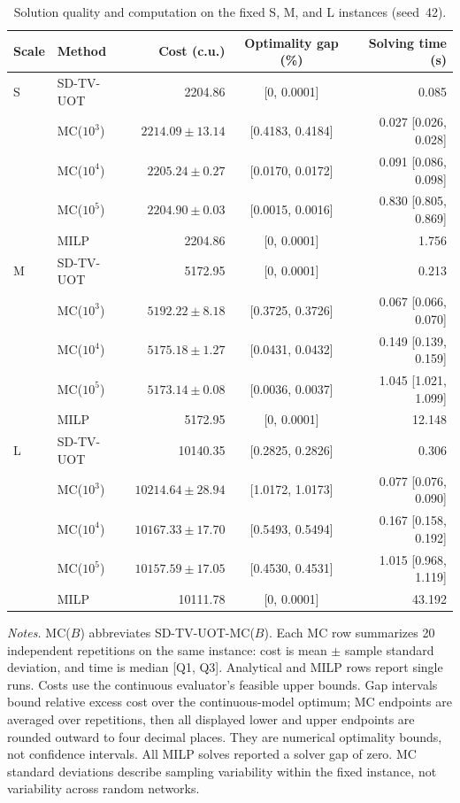 \documentclass[a4paper,fleqn]{cas-sc}
\theoremstyle{remark}
\theoremstyle{plain}
\begin{document}
\begin{table}[pos=htbp]
\centering
\caption{Solution quality and computation on the fixed S, M, and L instances (seed~42).}
\label{tab:exp1-quality}
\small
\setlength{\tabcolsep}{4pt}
\renewcommand{\arraystretch}{1.15}
\begin{tabular*}{\linewidth}{@{\extracolsep{\fill}}llrcr@{}}
\toprule
Scale & Method & Cost (c.u.) & Optimality gap (\%) & Solving time (s) \\
\midrule
S & SD-TV-UOT & 2204.86 & [0, 0.0001] & 0.085 \\[2pt]
 & MC($10^3$) & $2214.09\pm13.14$ & [0.4183, 0.4184] & 0.027 [0.026, 0.028] \\[2pt]
 & MC($10^4$) & $2205.24\pm0.27$ & [0.0170, 0.0172] & 0.091 [0.086, 0.098] \\[2pt]
 & MC($10^5$) & $2204.90\pm0.03$ & [0.0015, 0.0016] & 0.830 [0.805, 0.869] \\[2pt]
 & MILP & 2204.86 & [0, 0.0001] & 1.756 \\[2pt]
\midrule
M & SD-TV-UOT & 5172.95 & [0, 0.0001] & 0.213 \\[2pt]
 & MC($10^3$) & $5192.22\pm8.18$ & [0.3725, 0.3726] & 0.067 [0.066, 0.070] \\[2pt]
 & MC($10^4$) & $5175.18\pm1.27$ & [0.0431, 0.0432] & 0.149 [0.139, 0.159] \\[2pt]
 & MC($10^5$) & $5173.14\pm0.08$ & [0.0036, 0.0037] & 1.045 [1.021, 1.099] \\[2pt]
 & MILP & 5172.95 & [0, 0.0001] & 12.148 \\[2pt]
\midrule
L & SD-TV-UOT & 10140.35 & [0.2825, 0.2826] & 0.306 \\[2pt]
 & MC($10^3$) & $10214.64\pm28.94$ & [1.0172, 1.0173] & 0.077 [0.076, 0.090] \\[2pt]
 & MC($10^4$) & $10167.33\pm17.70$ & [0.5493, 0.5494] & 0.167 [0.158, 0.192] \\[2pt]
 & MC($10^5$) & $10157.59\pm17.05$ & [0.4530, 0.4531] & 1.015 [0.968, 1.119] \\[2pt]
 & MILP & 10111.78 & [0, 0.0001] & 43.192 \\[2pt]
\bottomrule
\end{tabular*}
\par\smallskip
\begin{minipage}{\linewidth}
\footnotesize
\textit{Notes.} MC($B$) abbreviates SD-TV-UOT-MC($B$). Each MC row summarizes 20 independent repetitions on the same instance: cost is mean $\pm$ sample standard deviation, and time is median [Q1, Q3]. Analytical and MILP rows report single runs. Costs use the continuous evaluator's feasible upper bounds. Gap intervals bound relative excess cost over the continuous-model optimum; MC endpoints are averaged over repetitions, then all displayed lower and upper endpoints are rounded outward to four decimal places. They are numerical optimality bounds, not confidence intervals. All MILP solves reported a solver gap of zero. MC standard deviations describe sampling variability within the fixed instance, not variability across random networks.
\end{minipage}
\end{table}
\end{document}
